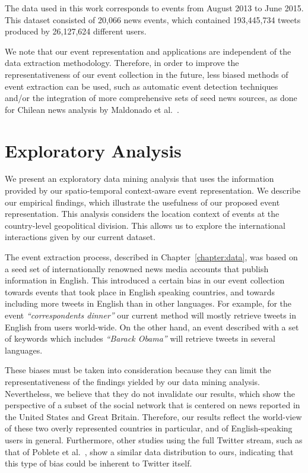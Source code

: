 %
The data used in this work corresponds to events from August 2013 to June 2015.
%
This dataset consisted of 20,066 news events, which contained 193,445,734 tweets
produced by 26,127,624 different users.

We note that our event representation and applications are independent of the
data extraction methodology.  
%
Therefore, in order to improve the representativeness of our event collection in
the future, less biased methods of event extraction can be used, such as
automatic event detection techniques~\cite{Metzler_2012, Choi_2012} and/or the
integration of more comprehensive sets of seed news sources, as done for Chilean
news analysis by Maldonado et al.~\cite{maldonado2015spatio}.


\section{Exploratory Analysis}\label{sec:geo:mining}

We present an exploratory data mining analysis that uses the information
provided by our spatio-temporal context-aware event representation.  
%
We describe our empirical findings, which illustrate the usefulness of our
proposed event representation.  
%
This analysis considers the location context of events at the country-level
geopolitical division.  
%
This allows us to explore the international interactions given by our current
dataset. 


The event extraction process, described in Chapter~\ref{chapter:data}, was based
on a seed set of internationally renowned news media accounts that publish
information in English. 
%
This introduced a certain bias in our event collection towards events that took
place in English speaking countries, and towards including more tweets in
English than in other languages. 
%
For example, for the event {\it ``correspondents dinner''} our current method
will mostly retrieve tweets in English from users world-wide. 
%
On the other hand, an event described with a set of keywords which includes {\it
``Barack Obama''} will retrieve tweets in several languages. 


These biases must be taken into consideration because they can limit the
representativeness of the findings yielded by our data mining analysis.
%
Nevertheless, we believe that they do not invalidate our results, which show the
perspective of a subset of the social network that is centered on news reported
in the United States and Great Britain. 
%
Therefore, our results reflect the world-view of these two overly represented
countries in particular, and of English-speaking users in general.
%
Furthermore, other studies using the full Twitter stream, such as that of
Poblete et al.~\cite{Poblete:2011:BTS:2063576.2063724}, show a similar data
distribution to ours, indicating that this type of bias could be inherent to
Twitter itself.

